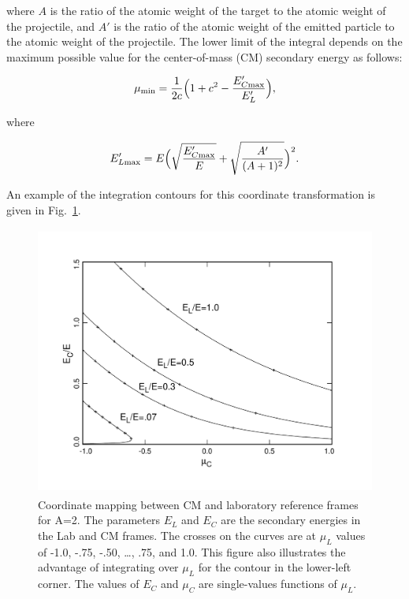 \noindent
where $A$ is the ratio of the atomic weight of the target to the atomic
weight of the projectile, and $A'$ is the ratio of the atomic weight of
the emitted particle to the atomic weight of the projectile.  The
lower limit of the integral depends on the maximum possible value for
the center-of-mass (CM) secondary energy as follows:

\begin{equation}
   \mu_{\rm min}=\frac{1}{2c}\Bigl(1+c^2-\frac{E'_{C{\rm max}}}{E'_L}\Bigr),
\label{yy5}
\end{equation}

\noindent
where

\begin{equation}
   E'_{L{\rm max}}=E\Bigl(\sqrt{\frac{E'_{C{\rm max}}}{E}}+
      \sqrt{\frac{A'}{(A+1)^2}}\Bigr)^2.
\label{yy6}
\end{equation}
\vspace{0.5 pt}

\noindent
An example of the integration contours for this coordinate transformation
is given in Fig.~\ref{transform}.

\begin{figure}[thb]\centering
\includegraphics[keepaspectratio, height=3.5in, angle=0]{figs/groupr7ack}
\caption[Coordinate mapping between CM and LAB reference frames
 for A=2]{Coordinate mapping between CM and laboratory reference frames
 for A=2.  The parameters $E_L$ and $E_C$ are the secondary energies in the
 Lab and CM frames.  The crosses on the curves are at $\mu_L$ values of -1.0,
 -.75, -.50, \ldots, .75, and 1.0.  This figure also illustrates the advantage
 of integrating over $\mu_L$ for the contour in the lower-left corner.  The
 values of $E_C$ and $\mu_C$ are single-values functions of $\mu_L$.}
\label{transform}
\end{figure}

